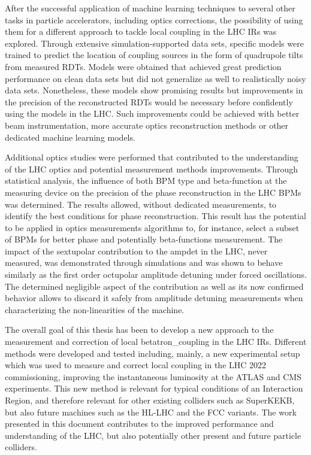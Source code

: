 After the successful application of machine learning techniques to several other tasks in particle accelerators, including optics corrections, the possibility of using them for a different approach to tackle local coupling in the \gls{LHC} \glspl{IR} was explored.
Through extensive simulation-supported data sets, specific models were trained to predict the location of coupling sources in the form of quadrupole tilts from measured \glspl{RDT}.
Models were obtained that achieved great prediction performance on clean data sets but did not generalize as well to realistically noisy data sets.
Nonetheless, these models show promising results but improvements in the precision of the reconstructed \glspl{RDT} would be necessary before confidently using the models in the \gls{LHC}.
Such improvements could be achieved with better beam instrumentation, more accurate optics reconstruction methods or other dedicated machine learning models.
\break

Additional \gls{optics} studies were performed that contributed to the understanding of the \gls{LHC} \gls{optics} and potential measurement methods improvements.
Through statistical analysis, the influence of both \gls{BPM} type and \gls{beta-function} at the measuring device on the precision of the phase reconstruction in the \gls{LHC} \glspl{BPM} was determined.
The results allowed, without dedicated measurements, to identify the best conditions for phase reconstruction.
This result has the potential to be applied in optics measurements algorithms to, for instance, select a subset of \glspl{BPM} for better phase and potentially \glspl{beta-function} measurement.
The impact of the sextupolar contribution to the \gls{ampdet} in the \gls{LHC}, never measured, was demonstrated through simulations and was shown to behave similarly as the first order octupolar amplitude detuning under forced oscillations.
The determined negligible aspect of the contribution as well as its now confirmed behavior allows to discard it safely from amplitude detuning measurements when characterizing the non-linearities of the machine.
\break

The overall goal of this thesis has been to develop a new approach to the measurement and correction of local \gls{betatron_coupling} in the \gls{LHC} \glspl{IR}.
Different methods were developed and tested including, mainly, a new experimental setup which was used to measure and correct local coupling in the \gls{LHC} \num{2022} commissioning, improving the instantaneous luminosity at the \acrshort{ATLAS} and \acrshort{CMS} \glspl{experiment}.
This new method is relevant for typical conditions of an Interaction Region, and therefore relevant for other existing colliders such as SuperKEKB, but also future machines such as the \gls{HL-LHC} and the \gls{FCC} variants.
The work presented in this document contributes to the improved performance and understanding of the \gls{LHC}, but also potentially other present and future particle colliders.

\glsresetall                                     %
